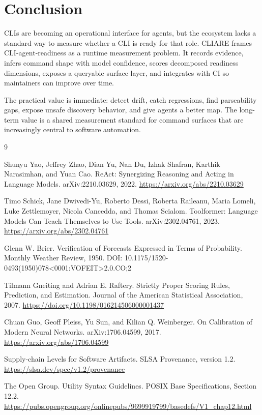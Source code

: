 \documentclass[11pt]{article}
\begin{document}
\section{Conclusion}

CLIs are becoming an operational interface for agents, but the ecosystem lacks a standard way to measure whether a CLI is ready for that role. CLIARE frames CLI-agent-readiness as a runtime measurement problem. It records evidence, infers command shape with model confidence, scores decomposed readiness dimensions, exposes a queryable surface layer, and integrates with CI so maintainers can improve over time.

The practical value is immediate: detect drift, catch regressions, find parseability gaps, expose unsafe discovery behavior, and give agents a better map. The long-term value is a shared measurement standard for command surfaces that are increasingly central to software automation.

\begin{thebibliography}{9}

Shunyu Yao, Jeffrey Zhao, Dian Yu, Nan Du, Izhak Shafran, Karthik Narasimhan, and Yuan Cao.
\newblock ReAct: Synergizing Reasoning and Acting in Language Models.
\newblock arXiv:2210.03629, 2022.
\newblock \url{https://arxiv.org/abs/2210.03629}

Timo Schick, Jane Dwivedi-Yu, Roberto Dessi, Roberta Raileanu, Maria Lomeli, Luke Zettlemoyer, Nicola Cancedda, and Thomas Scialom.
\newblock Toolformer: Language Models Can Teach Themselves to Use Tools.
\newblock arXiv:2302.04761, 2023.
\newblock \url{https://arxiv.org/abs/2302.04761}

Glenn W. Brier.
\newblock Verification of Forecasts Expressed in Terms of Probability.
\newblock Monthly Weather Review, 1950.
\newblock DOI: 10.1175/1520-0493(1950)078<0001:VOFEIT>2.0.CO;2

Tilmann Gneiting and Adrian E. Raftery.
\newblock Strictly Proper Scoring Rules, Prediction, and Estimation.
\newblock Journal of the American Statistical Association, 2007.
\newblock \url{https://doi.org/10.1198/016214506000001437}

Chuan Guo, Geoff Pleiss, Yu Sun, and Kilian Q. Weinberger.
\newblock On Calibration of Modern Neural Networks.
\newblock arXiv:1706.04599, 2017.
\newblock \url{https://arxiv.org/abs/1706.04599}

Supply-chain Levels for Software Artifacts.
\newblock SLSA Provenance, version 1.2.
\newblock \url{https://slsa.dev/spec/v1.2/provenance}

The Open Group.
\newblock Utility Syntax Guidelines.
\newblock POSIX Base Specifications, Section 12.2.
\newblock \url{https://pubs.opengroup.org/onlinepubs/9699919799/basedefs/V1_chap12.html}

\end{thebibliography}
\end{document}

